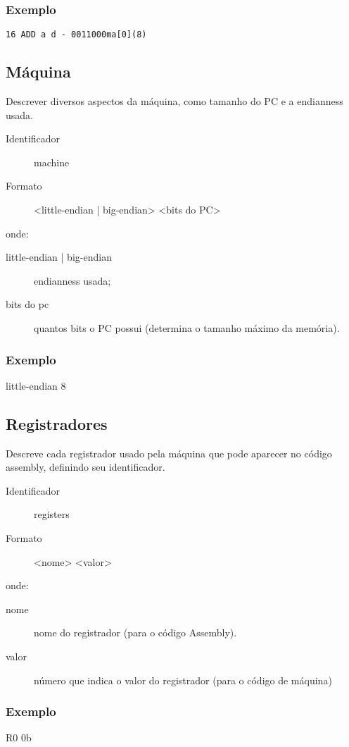 \documentclass[a4paper,10pt]{article}
\begin{document}
		\subsubsection{Exemplo}
			\verb+16 ADD a d - 0011000ma[0](8)+

	\subsection{Máquina}
		\label{máquina}
		Descrever diversos aspectos da máquina, como tamanho do PC e a endianness usada.
		\begin{description}
		 \item [Identificador] machine
		 \item [Formato] <little-endian | big-endian> <bits do PC>
		\end{description}
		onde:
		\begin{description}
		 \item [little-endian | big-endian] endianness usada;
		 \item [bits do pc] quantos bits o PC possui (determina o tamanho máximo da memória).
		\end{description}

		\subsubsection{Exemplo}
			little-endian 8
			
	\subsection{Registradores}
		\label{registradores}
		
		Descreve cada registrador usado pela máquina que pode aparecer no código assembly, definindo seu identificador.
		\begin{description}
		 \item [Identificador] registers
		 \item [Formato] <nome> <valor>
		\end{description}
		onde:
		\begin{description}
		 \item [nome] nome do registrador (para o código Assembly).
		 \item [valor] número que indica o valor do registrador (para o código de máquina)
		\end{description}

		\subsubsection{Exemplo}
			R0 0b
			
\end{document}
